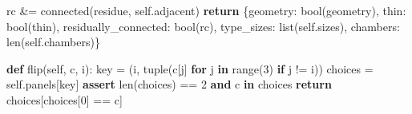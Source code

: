 \documentclass[
  10pt,
  letterpaper,
]{article}
\newenvironment{Shaded}{}{}
\newcommand{\BuiltInTok}[1]{\textcolor[rgb]{0.00,0.50,0.00}{#1}}
\newcommand{\ControlFlowTok}[1]{\textcolor[rgb]{0.00,0.44,0.13}{\textbf{#1}}}
\newcommand{\DecValTok}[1]{\textcolor[rgb]{0.25,0.63,0.44}{#1}}
\newcommand{\KeywordTok}[1]{\textcolor[rgb]{0.00,0.44,0.13}{\textbf{#1}}}
\newcommand{\NormalTok}[1]{#1}
\newcommand{\OperatorTok}[1]{\textcolor[rgb]{0.40,0.40,0.40}{#1}}
\newcommand{\StringTok}[1]{\textcolor[rgb]{0.25,0.44,0.63}{#1}}
\newcommand{\VariableTok}[1]{\textcolor[rgb]{0.10,0.09,0.49}{#1}}
\begin{document}
\begin{Shaded}
\begin{Highlighting}[]
\NormalTok{            rc }\OperatorTok{\&=}\NormalTok{ connected(residue, }\VariableTok{self}\NormalTok{.adjacent)}
        \ControlFlowTok{return}\NormalTok{ \{}\StringTok{\textquotesingle{}geometry\textquotesingle{}}\NormalTok{: }\BuiltInTok{bool}\NormalTok{(geometry), }\StringTok{\textquotesingle{}thin\textquotesingle{}}\NormalTok{: }\BuiltInTok{bool}\NormalTok{(thin),}
                \StringTok{\textquotesingle{}residually\_connected\textquotesingle{}}\NormalTok{: }\BuiltInTok{bool}\NormalTok{(rc), }\StringTok{\textquotesingle{}type\_sizes\textquotesingle{}}\NormalTok{: }\BuiltInTok{list}\NormalTok{(}\VariableTok{self}\NormalTok{.sizes),}
                \StringTok{\textquotesingle{}chambers\textquotesingle{}}\NormalTok{: }\BuiltInTok{len}\NormalTok{(}\VariableTok{self}\NormalTok{.chambers)\}}

    \KeywordTok{def}\NormalTok{ flip(}\VariableTok{self}\NormalTok{, c, i):}
\NormalTok{        key }\OperatorTok{=}\NormalTok{ (i, }\BuiltInTok{tuple}\NormalTok{(c[j] }\ControlFlowTok{for}\NormalTok{ j }\KeywordTok{in} \BuiltInTok{range}\NormalTok{(}\DecValTok{3}\NormalTok{) }\ControlFlowTok{if}\NormalTok{ j }\OperatorTok{!=}\NormalTok{ i))}
\NormalTok{        choices }\OperatorTok{=} \VariableTok{self}\NormalTok{.panels[key]}
        \ControlFlowTok{assert} \BuiltInTok{len}\NormalTok{(choices) }\OperatorTok{==} \DecValTok{2} \KeywordTok{and}\NormalTok{ c }\KeywordTok{in}\NormalTok{ choices}
        \ControlFlowTok{return}\NormalTok{ choices[choices[}\DecValTok{0}\NormalTok{] }\OperatorTok{==}\NormalTok{ c]}


\end{Highlighting}
\end{Shaded}
\end{document}
